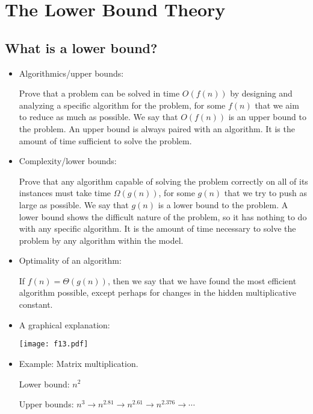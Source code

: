 \documentclass{article}
\begin{document}
\newpage

\section{The Lower Bound Theory}

\subsection{What is a lower bound?}

\begin{itemize}

\item Algorithmics/upper bounds:

Prove that a problem can be solved in time $O(f(n))$ by designing
and analyzing a specific algorithm for the problem, for some
$f(n)$ that we aim to reduce as much as possible. We say that 
$O(f(n))$ is an upper bound to the problem. An upper bound is
always paired with an algorithm. It is the amount of time sufficient
to solve the problem.

\item Complexity/lower bounds:

Prove that any algorithm capable of solving the problem correctly
on all of its instances must take time $\Omega(g(n))$, for some 
$g(n)$ that we try to push as large as possible. We say that 
$g(n)$ is a lower bound to the problem. A lower bound shows the
difficult nature of the problem, so it has nothing to do with any
specific algorithm. It is the amount of time necessary to solve
the problem by any algorithm within the model.

\item Optimality of an algorithm:

If $f(n)=\Theta(g(n))$, then we say that we have found the most efficient 
algorithm possible, except perhaps for changes in the hidden multiplicative
constant.

\item A graphical explanation:

\vskip0.25cm
\begin{center}
\texttt{[image: f13.pdf]}
\end{center}

\item Example: Matrix multiplication.

Lower bound: $n^2$

Upper bounds: $n^3\rightarrow n^{2.81}\rightarrow n^{2.61}\rightarrow
n^{2.376}\rightarrow\cdots$
   
\end{itemize}
\end{document}
